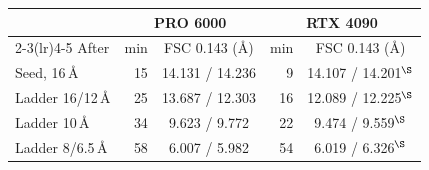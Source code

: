 \begin{table}[t]
\centering
\footnotesize
\setlength{\tabcolsep}{3pt}
\begin{tabular}{@{}lrcrc@{}}
\toprule
& \multicolumn{2}{c}{PRO 6000} & \multicolumn{2}{c}{RTX 4090} \\
\cmidrule(lr){2-3}\cmidrule(lr){4-5}
After & min & FSC 0.143 (\AA) & min & FSC 0.143 (\AA) \\
\midrule
Seed, 16\,\AA & 15 & 14.131 / 14.236 & 9 & 14.107 / 14.201$^\S$ \\
Ladder 16/12\,\AA & 25 & 13.687 / 12.303 & 16 & 12.089 / 12.225$^\S$ \\
Ladder 10\,\AA & 34 & 9.623 / 9.772 & 22 & 9.474 / 9.559$^\S$ \\
Ladder 8/6.5\,\AA & 58 & 6.007 / 5.982 & 54 & 6.019 / 6.326$^\S$ \\

\end{tabular}
\end{table}
